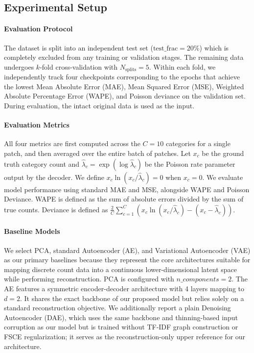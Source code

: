 \documentclass[sigconf]{acmart}
\begin{document}
\subsection{Experimental Setup}

\paragraph{Evaluation Protocol}
The dataset is split into an independent test set ($\text{test\_frac}=20\%$) which is completely excluded from any training or validation stages. The remaining data undergoes $k$-fold cross-validation with $N_{\text{splits}}=5$. Within each fold, we independently track four checkpoints corresponding to the epochs that achieve the lowest Mean Absolute Error (MAE), Mean Squared Error (MSE), Weighted Absolute Percentage Error (WAPE), and Poisson deviance on the validation set. During evaluation, the intact original data is used as the input. 

\paragraph{Evaluation Metrics}
All four metrics are first computed across the $C=10$ categories for a single patch, and then averaged over the entire batch of patches. Let $x_c$ be the ground truth category count and $\hat\lambda_c=\exp(\log\hat\lambda_c)$ be the Poisson rate parameter output by the decoder. We define $x_c\ln(x_c/\hat\lambda_c) = 0$ when $x_c=0$. We evaluate model performance using standard MAE and MSE, alongside WAPE and Poisson Deviance. WAPE is defined as the sum of absolute errors divided by the sum of true counts. Deviance is defined as $\frac{2}{C}\sum_{c=1}^{C}\left(x_c\ln(x_c/\hat\lambda_c)-(x_c-\hat\lambda_c)\right)$.

\paragraph{Baseline Models}
We select PCA, standard Autoencoder (AE), and Variational Autoencoder (VAE) as our primary baselines because they represent the core architectures suitable for mapping discrete count data into a continuous lower-dimensional latent space while performing reconstruction. PCA is configured with $n\_components=2$. The AE features a symmetric encoder-decoder architecture with 4 layers mapping to $d=2$. It shares the exact backbone of our proposed model but relies solely on a standard reconstruction objective. We additionally report a plain Denoising Autoencoder (DAE), which uses the same backbone and thinning-based input corruption as our model but is trained without TF-IDF graph construction or FSCE regularization; it serves as the reconstruction-only upper reference for our architecture.
\end{document}
